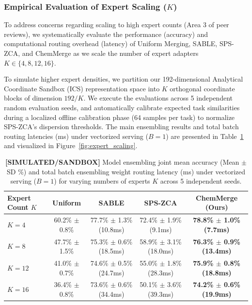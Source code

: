 \subsubsection{Empirical Evaluation of Expert Scaling ($K$)}
\label{sec:expert_scaling}
To address concerns regarding scaling to high expert counts (Area 3 of peer reviews), we systematically evaluate the performance (accuracy) and computational routing overhead (latency) of Uniform Merging, SABLE, SPS-ZCA, and ChemMerge as we scale the number of expert adapters $K \in \{4, 8, 12, 16\}$. 

To simulate higher expert densities, we partition our 192-dimensional Analytical Coordinate Sandbox (ICS) representation space into $K$ orthogonal coordinate blocks of dimension $192 / K$. We execute the evaluations across 5 independent random evaluation seeds, and automatically calibrate expected task similarities during a localized offline calibration phase (64 samples per task) to normalize SPS-ZCA's dispersion thresholds. The main ensembling results and total batch routing latencies (ms) under vectorized serving ($B=1$) are presented in Table~\ref{tab:expert_scaling} and visualized in Figure~\ref{fig:expert_scaling}.

\begin{table}[t]
\caption{\textbf{[SIMULATED/SANDBOX]} Model ensembling joint mean accuracy (Mean $\pm$ SD \%) and total batch ensembling weight routing latency (ms) under vectorized serving ($B=1$) for varying numbers of experts $K$ across 5 independent seeds.}
\label{tab:expert_scaling}
\vskip 0.1in
\begin{center}
\begin{scriptsize}
\begin{sc}
\setlength{\tabcolsep}{3pt}
\begin{tabular}{lcccc}
\toprule
Expert Count $K$ & Uniform & SABLE & SPS-ZCA & \textbf{ChemMerge (Ours)} \\
\midrule
$K = 4$  & 60.2\% $\pm$ 0.8\% & 77.7\% $\pm$ 1.3\% (10.8ms) & 72.4\% $\pm$ 1.9\% (9.1ms)  & \textbf{78.8\% $\pm$ 1.0\% (7.7ms)} \\
$K = 8$  & 47.7\% $\pm$ 1.5\% & 75.3\% $\pm$ 0.6\% (18.5ms) & 58.9\% $\pm$ 3.1\% (18.0ms) & \textbf{76.3\% $\pm$ 0.9\% (13.4ms)} \\
$K = 12$ & 41.0\% $\pm$ 0.7\% & 74.6\% $\pm$ 0.5\% (24.7ms) & 55.0\% $\pm$ 1.8\% (28.3ms) & \textbf{75.9\% $\pm$ 0.8\% (18.8ms)} \\
$K = 16$ & 36.4\% $\pm$ 0.8\% & 73.6\% $\pm$ 0.6\% (34.4ms) & 50.1\% $\pm$ 3.6\% (39.3ms) & \textbf{74.2\% $\pm$ 0.6\% (19.9ms)} \\
\bottomrule
\end{tabular}
\end{sc}
\end{scriptsize}
\end{center}
\vskip -0.1in
\end{table}

